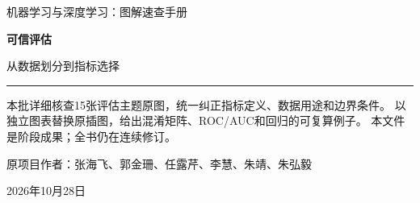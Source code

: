\documentclass[a4paper,11pt,oneside,openany]{book}
\begin{document}
\frontmatter
\hypersetup{pageanchor=false}
\begin{titlepage}
\vspace*{16mm}
{\sffamily\color{Teal}\large 机器学习与深度学习：图解速查手册\par}
\vspace{15mm}
{\sffamily\bfseries\color{Ink}\Huge 可信评估\par}
\vspace{6mm}
{\sffamily\color{Ink}\LARGE 从数据划分到指标选择\par}
\vspace{12mm}
\noindent\textcolor{Teal}{\rule{\textwidth}{1.2pt}}
\vspace{7mm}
\begin{keyidea}[第三批阶段样章]
本批详细核查15张评估主题原图，统一纠正指标定义、数据用途和边界条件。
以独立图表替换原插图，给出混淆矩阵、ROC/AUC和回归的可复算例子。
本文件是阶段成果；全书仍在连续修订。
\end{keyidea}
\vfill
原项目作者：张海飞、郭金珊、任露芹、李慧、朱靖、朱弘毅\par
\vspace{4mm}
2026年10月28日\par
\end{titlepage}
\hypersetup{pageanchor=true}
\tableofcontents
\mainmatter
\setcounter{chapter}{2}

\end{document}
